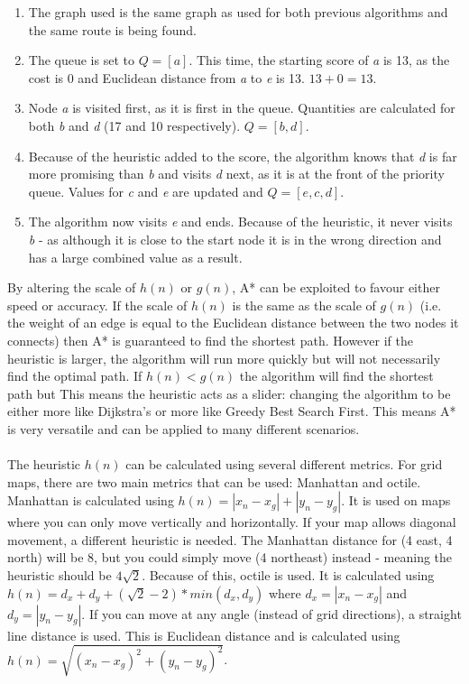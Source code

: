 \documentclass[titlepage]{article}
\begin{document}
\begin{enumerate}
\item The graph used is the same graph as used for both previous algorithms and the same route is being found.
\item The queue is set to $Q=[a]$. This time, the starting score of \textit{a} is 13, as the cost is 0 and Euclidean distance from \textit{a} to \textit{e} is 13. $13+0=13$. 
\item Node \textit{a} is visited first, as it is first in the queue. Quantities are calculated for both \textit{b} and \textit{d} (17 and 10 respectively). $Q=[b,d]$.
\item Because of the heuristic added to the score, the algorithm knows that \textit{d} is far more promising than \textit{b} and visits \textit{d} next, as it is at the front of the priority queue. Values for \textit{c} and \textit{e} are updated and $Q=[e,c,d]$.
\item The algorithm now visits \textit{e} and ends. Because of the heuristic, it never visits \textit{b} - as although it is close to the start node it is in the wrong direction and has a large combined value as a result.
\end{enumerate}

By altering the scale of $h(n)$ or $g(n)$, A* can be exploited to favour either speed or accuracy. If the scale of $h(n)$ is the same as the scale of $g(n)$ (i.e. the weight of an edge is equal to the Euclidean distance between the two nodes it connects) then A* is guaranteed to find the shortest path. However if the heuristic is larger, the algorithm will run more quickly but will not necessarily find the optimal path. If $h(n) < g(n)$ the algorithm will find the shortest path but This means the heuristic acts as a slider: changing the algorithm to be either more like Dijkstra's or more like Greedy Best Search First. This means A* is very versatile and can be applied to many different scenarios.
\\\\
The heuristic $h(n)$ can be calculated using several different metrics. For grid maps, there are two main metrics that can be used: Manhattan and octile. Manhattan is calculated using $h(n) =  \left|x_n-x_g\right| +  \left|y_n-y_g\right|$. It is used on maps where you can only move vertically and horizontally. If your map allows diagonal movement, a different heuristic is needed. The Manhattan distance for (4 east, 4 north) will be 8, but you could simply move (4 northeast) instead - meaning the heuristic should be $4\sqrt{2}$. Because of this, octile is used. It is calculated using $h(n) = d_x + d_y + (\sqrt{2}-2)*min(d_x, d_y)$ where $d_x = \left|x_n-x_g\right|$  and $d_y = \left|y_n-y_g\right|$. If you can move at any angle (instead of grid directions), a straight line distance is used. This is Euclidean distance and is calculated using $h(n) = \sqrt{(x_n-x_g)^2 + (y_n-y_g)^2}$. 
\end{document}
